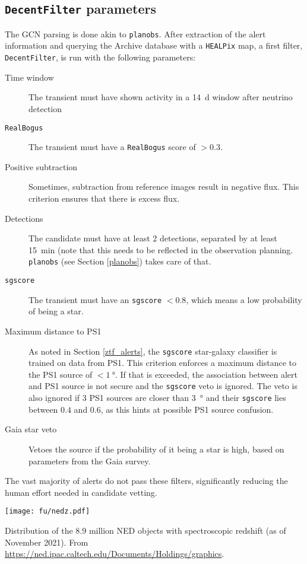 \subsection{\texttt{DecentFilter} parameters}
The GCN parsing is done akin to \texttt{planobs}. After extraction of the alert information and querying the Archive database with a \texttt{HEALPix} map, a first filter, \texttt{DecentFilter}, is run with the following parameters:
\begin{description}
    \item[Time window] The transient must have shown activity in a \SI{14}{\day} window after neutrino detection
    \item[\texttt{RealBogus}] The transient must have a \texttt{RealBogus} score of $>0.3$.
    \item[Positive subtraction] Sometimes, subtraction from reference images result in negative flux. This criterion ensures that there is excess flux.
    \item[Detections] The candidate must have at least 2 detections, separated by at least \SI{15}{\minute} (note that this needs to be reflected in the observation planning. \texttt{planobs} (see Section \ref{planobs}) takes care of that.
    \item[\texttt{sgscore}] The transient must have an \texttt{sgscore} $<0.8$, which means a low probability of being a star.
    \item[Maximum distance to PS1] As noted in Section \ref{ztf_alerts}, the \texttt{sgscore} star-galaxy classifier is trained on data from PS1. This criterion enforces a maximum distance to the PS1 source of $<\SI{1}{\degree}$. If that is exceeded, the association between alert and PS1 source is not secure and the \texttt{sgscore} veto is ignored. The veto is also ignored if 3 PS1 sources are closer than \SI{3}{\degree} and their \texttt{sgscore} lies between $0.4$ and $0.6$, as this hints at possible PS1 source confusion.
    \item[Gaia star veto] Vetoes the source if the probability of it being a star is high, based on parameters from the Gaia survey.
\end{description}
The vast majority of alerts do not pass these filters, significantly reducing the human effort needed in candidate vetting. 
\begin{marginfigure}
    \texttt{[image: fu/nedz.pdf]}
    \caption[NED spectroscopic redshift distribution]{Distribution of the 8.9 million NED objects with spectroscopic redshift (as of November 2021). From \url{https://ned.ipac.caltech.edu/Documents/Holdings/graphics}.}
\end{marginfigure} 
